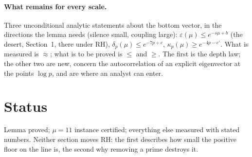 \documentclass[11pt]{article}
\begin{document}
\paragraph{What remains for every scale.} Three unconditional analytic statements about the bottom vector, in the directions the lemma needs (silence small, coupling large): $\varepsilon(\mu)\le e^{-s\mu+b}$ (the desert, Section~1, there under RH), $\delta_p(\mu)\le e^{-7p+c}$, $\kappa_p(\mu)\ge e^{-4p-c'}$. What is measured is $\approx$; what is to be proved is $\le$ and $\ge$. The first is the depth law; the other two are new, concern the autocorrelation of an explicit eigenvector at the points $\log p$, and are where an analyst can enter.

\section*{Status}
Lemma proved; $\mu=11$ instance certified; everything else measured with stated numbers. Neither section moves RH: the first describes how small the positive floor on the line is, the second why removing a prime destroys it.
\end{document}
